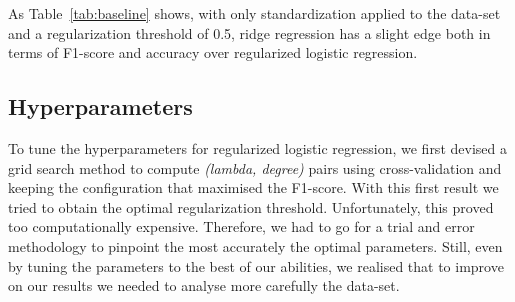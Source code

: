 \documentclass[10pt,conference,compsocconf]{IEEEtran}
\begin{document}
\begin{comment}
\begin{table}[ht]
\centering
\resizebox{\columnwidth}{!}{%
\begin{tabular}{lrrr|r|r|r|}
\cline{5-7}
 &
  \multicolumn{1}{c}{} &
  \multicolumn{1}{l}{} &
  \multicolumn{1}{l|}{} &
  \multicolumn{1}{l|}{Training} &
  \multicolumn{1}{l|}{Validation} &
  \multicolumn{1}{l|}{Testing} \\ \cline{2-7} 
\multicolumn{1}{l|}{} &
  \multicolumn{3}{c|}{Parameters} &
  \multicolumn{1}{l|}{F1-score} &
  \multicolumn{1}{l|}{F1-score} &
  \multicolumn{1}{l|}{F1-score} \\ \hline
\multicolumn{1}{|l|}{Methods} &
  \multicolumn{1}{l|}{Gamma} &
  \multicolumn{1}{l|}{Lambda} &
  \multicolumn{1}{l|}{Max\_iters} &
  \multicolumn{1}{l|}{Accuracy} &
  \multicolumn{1}{l|}{Accuracy} &
  \multicolumn{1}{l|}{Accuracy} \\ \hline
\multicolumn{1}{|l|}{\multirow{2}{*}{\begin{tabular}[c]{@{}l@{}}Regularized logistic \\ regression\end{tabular}}} &
  \multicolumn{1}{r|}{0.4} &
  \multicolumn{1}{r|}{5e-2} &
  6000 &
  44.79\% &
  44.80\% &
  44.90\% \\
\multicolumn{1}{|l|}{} &
  \multicolumn{1}{r|}{} &
  \multicolumn{1}{r|}{} &
   &
  72.80\% &
  72.80\% &
  72.90\% \\ \hline
\multicolumn{1}{|l|}{\multirow{2}{*}{Ridge Regression}} &
  \multicolumn{1}{r|}{-} &
  \multicolumn{1}{r|}{1e-4} &
  - &
  56.70\% &
  56.70\% &
  56.70\% \\
\multicolumn{1}{|l|}{} &
  \multicolumn{1}{r|}{} &
  \multicolumn{1}{r|}{} &
   &
  74.43\% &
  74.42\% &
  74.40\% \\ \hline
\end{tabular}%
}
\caption{Parameters, F1-score and accuracy results for the initial implementation
using the entire data-set.}
\label{tab:baseline}
\end{table}
\end{comment}

As Table~\ref{tab:baseline} shows, with only standardization applied to 
the data-set and a regularization threshold of 0.5, ridge regression has 
a slight edge both in terms of F1-score and accuracy over regularized 
logistic regression.

\subsection{Hyperparameters}
To tune the hyperparameters for regularized logistic regression, 
we first devised a grid search method to compute \textit{(lambda, degree)} 
pairs using cross-validation and keeping the configuration 
that maximised the F1-score. With this first result we tried to obtain 
the optimal regularization threshold.
Unfortunately, this proved too computationally expensive. Therefore, 
we had to go for a trial and error methodology to pinpoint the most 
accurately the optimal parameters.
Still, even by tuning the parameters to the best of our abilities, 
we realised that to improve on our results we needed to analyse more 
carefully the data-set.
\end{document}
